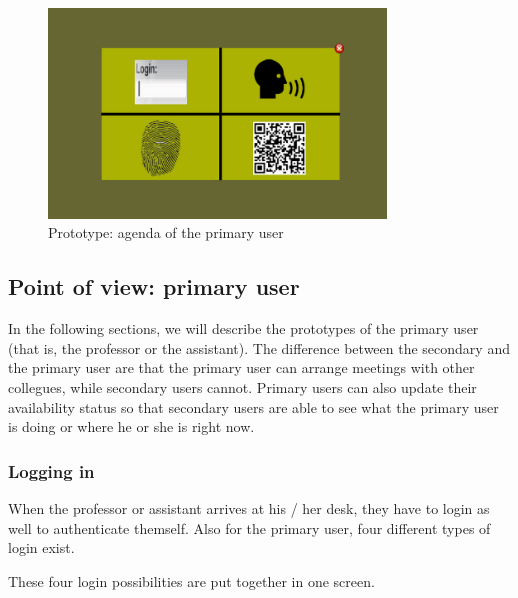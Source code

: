 \documentclass[11pt, a4paper,svglistings]{report}
\begin{document}
\begin{figure}[H]
\centering
    \includegraphics[width=0.8\textwidth]{Prototypes/Login.png}
  \caption{Prototype: agenda of the primary user}
\end{figure}


\newpage

\subsection{Point of view: primary user}

In the following sections, we will describe the prototypes of the primary user (that is, the professor or the assistant). The difference between the secondary and the primary user are that the primary user can arrange meetings with other collegues, while secondary users cannot. Primary users can also update their availability status so that secondary users are able to see what the primary user is doing or where he or she is right now.

\subsubsection{Logging in}

When the professor or assistant arrives at his / her desk, they have to login as well to authenticate themself. Also for the primary user, four different types of login exist.

These four login possibilities are put together in one screen.
\end{document}
